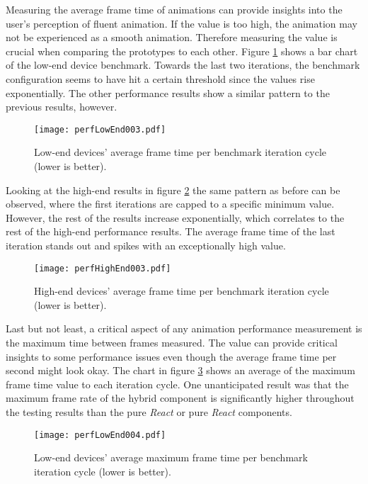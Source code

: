 
Measuring the average frame time of animations can provide insights into the user's perception of fluent animation. If the value is too high, the animation may not be experienced as a smooth animation. Therefore measuring the value is crucial when comparing the prototypes to each other. Figure \ref{fig:perfLowEnd003} shows a bar chart of the low-end device benchmark. Towards the last two iterations, the benchmark configuration seems to have hit a certain threshold since the values rise exponentially. The other performance results show a similar pattern to the previous results, however.

\begin{figure}
\centering
\texttt{[image: perfLowEnd003.pdf]}
\caption{Low-end devices' average frame time per benchmark iteration cycle (lower is better).}
\label{fig:perfLowEnd003}
\end{figure}

Looking at the high-end results in figure \ref{fig:perfHighEnd003} the same pattern as before can be observed, where the first iterations are capped to a specific minimum value. However, the rest of the results increase exponentially, which correlates to the rest of the high-end performance results. The average frame time of the last iteration stands out and spikes with an exceptionally high value.

\begin{figure}
\centering
\texttt{[image: perfHighEnd003.pdf]}
\caption{High-end devices' average frame time per benchmark iteration cycle (lower is better).}
\label{fig:perfHighEnd003}
\end{figure}

Last but not least, a critical aspect of any animation performance measurement is the maximum time between frames measured. The value can provide critical insights to some performance issues even though the average frame time per second might look okay. The chart in figure \ref{fig:perfLowEnd004} shows an average of the maximum frame time value to each iteration cycle. One unanticipated result was that the maximum frame rate of the hybrid component is significantly higher throughout the testing results than the pure \emph{React} or pure \emph{React} components.

\begin{figure}
\centering
\texttt{[image: perfLowEnd004.pdf]}
\caption{Low-end devices' average maximum frame time per benchmark iteration cycle (lower is better).}
\label{fig:perfLowEnd004}
\end{figure}

